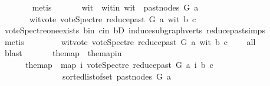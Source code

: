 \begin{isabellebody}
\ \ \ \ \ \ \isamarkupfalse%
\ metis\ \isanewline
\ \ \ \ \isamarkupfalse%
\ wit\ \ wit{\isacharunderscore}{\kern0pt}in{\isacharcolon}{\kern0pt}\ {\isachardoublequoteopen}wit\ {\isasymin}\ past{\isacharunderscore}{\kern0pt}nodes\ G\ a{\isachardoublequoteclose}\ \isanewline
\ \ \ \ \ \ \ wit{\isacharunderscore}{\kern0pt}vote{\isacharcolon}{\kern0pt}\ {\isachardoublequoteopen}vote{\isacharunderscore}{\kern0pt}Spectre\ {\isacharparenleft}{\kern0pt}reduce{\isacharunderscore}{\kern0pt}past\ G\ a{\isacharparenright}{\kern0pt}\ wit\ b\ c\ {\isasymnoteq}\ {}{\isachardoublequoteclose}\isanewline
\ \ \ \ \ \ \isamarkupfalse%
\ vote{\isacharunderscore}{\kern0pt}Spectre{\isacharunderscore}{\kern0pt}one{\isacharunderscore}{\kern0pt}exists\ b{\isacharunderscore}{\kern0pt}in{}\ c{\isacharunderscore}{\kern0pt}in{}\ bD\ induce{\isacharunderscore}{\kern0pt}subgraph{\isacharunderscore}{\kern0pt}verts\ reduce{\isacharunderscore}{\kern0pt}past{\isachardot}{\kern0pt}simps\isanewline
\ \ \ \ \ \ \isamarkupfalse%
\ metis\ \isanewline
\ \ \ \ \isamarkupfalse%
\ \isamarkupfalse%
\ wit{\isacharunderscore}{\kern0pt}vote{}{\isacharcolon}{\kern0pt}\ {\isachardoublequoteopen}vote{\isacharunderscore}{\kern0pt}Spectre\ {\isacharparenleft}{\kern0pt}reduce{\isacharunderscore}{\kern0pt}past\ G\ a{\isacharparenright}{\kern0pt}\ wit\ b\ c\ {\isacharequal}{\kern0pt}\ {}{\isachardoublequoteclose}\ \isamarkupfalse%
\ all{}{}\isanewline
\ \ \ \ \ \ \isamarkupfalse%
\ blast\ \isanewline
\ \ \ \ \isamarkupfalse%
\ the{\isacharunderscore}{\kern0pt}map\ \ the{\isacharunderscore}{\kern0pt}map{\isacharunderscore}{\kern0pt}in{\isacharcolon}{\kern0pt}\ \isanewline
\ \ \ \ \ \ {\isachardoublequoteopen}the{\isacharunderscore}{\kern0pt}map\ {\isacharequal}{\kern0pt}\ {\isacharparenleft}{\kern0pt}map\ {\isacharparenleft}{\kern0pt}{\isasymlambda}i{\isachardot}{\kern0pt}\ vote{\isacharunderscore}{\kern0pt}Spectre\ {\isacharparenleft}{\kern0pt}reduce{\isacharunderscore}{\kern0pt}past\ G\ a{\isacharparenright}{\kern0pt}\ i\ b\ c{\isacharparenright}{\kern0pt}\ \isanewline
\ \ \ \ \ \ \ \ \ \ \ \ \ \ \ {\isacharparenleft}{\kern0pt}sorted{\isacharunderscore}{\kern0pt}list{\isacharunderscore}{\kern0pt}of{\isacharunderscore}{\kern0pt}set\ {\isacharparenleft}{\kern0pt}past{\isacharunderscore}{\kern0pt}nodes\ G\ a{\isacharparenright}{\kern0pt}{\isacharparenright}{\kern0pt}{\isacharparenright}{\kern0pt}{\isachardoublequoteclose}\isanewline

\end{isabellebody}
